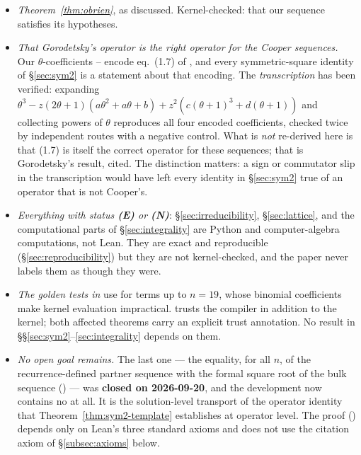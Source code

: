\begin{itemize}
\item \emph{Theorem~\ref{thm:obrien}}, as discussed. Kernel-checked:
  that our sequence satisfies its hypotheses.
\item \emph{That Gorodetsky's operator is the right operator for the Cooper
  sequences.} Our $\theta$-coefficients --
  encode eq.~(1.7) of \cite{Gorodetsky2023}, and every symmetric-square identity
  of \S\ref{sec:sym2} is a statement about that encoding. The \emph{transcription}
  has been verified: expanding
  $\theta^3 - z(2\theta+1)(a\theta^2 + a\theta + b) + z^2(c(\theta+1)^3 + d(\theta+1))$
  and collecting powers of $\theta$ reproduces all four encoded coefficients,
  checked twice by independent routes with a negative control. What is
  \emph{not} re-derived here is that (1.7) is itself the correct operator for
  these sequences; that is Gorodetsky's result, cited. The distinction matters:
  a sign or commutator slip in the transcription would have left every identity
  in \S\ref{sec:sym2} true of an operator that is not Cooper's.
\item \emph{Everything with status \textbf{(E)} or \textbf{(N)}}:
  \S\ref{sec:irreducibility}, \S\ref{sec:lattice}, and the computational parts
  of \S\ref{sec:integrality} are Python and computer-algebra computations, not
  Lean. They are exact and reproducible (\S\ref{sec:reproducibility}) but they
  are not kernel-checked, and the paper never labels them as though they were.
\item \emph{The golden tests in}  use
   for terms up to $n=19$, whose binomial
  coefficients make kernel evaluation impractical. 
  trusts the compiler in addition to the kernel; both affected theorems carry
  an explicit trust annotation. No result in \S\S\ref{sec:sym2}--\ref{sec:integrality}
  depends on them.
\item \emph{No open goal remains.} The last one --- the equality, for all $n$,
  of the recurrence-defined partner sequence with the formal square root of the
  bulk sequence () --- was
  \textbf{closed on 2026-09-20}, and the development now contains no
   at all. It is the solution-level transport of the operator
  identity that Theorem~\ref{thm:sym2-template} establishes at operator level.
  The proof () depends only on Lean's
  three standard axioms and does not use the citation axiom of
  \S\ref{subsec:axioms} below.


\end{itemize}

